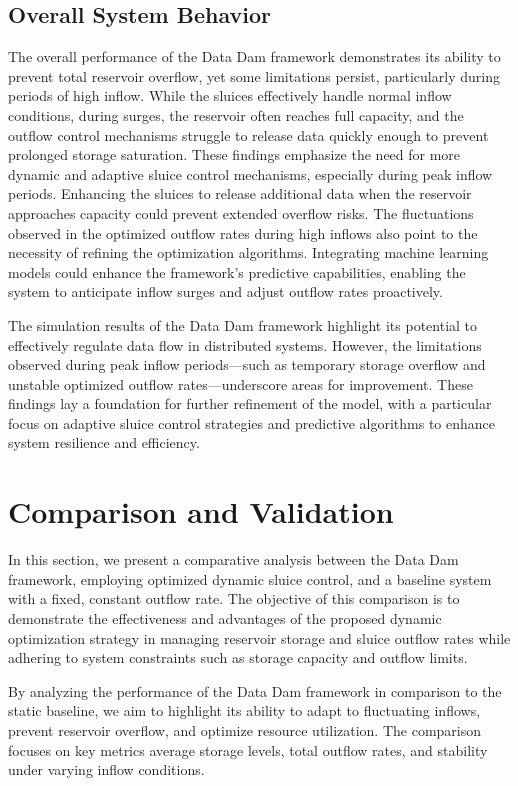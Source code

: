 \subsection{Overall System Behavior}
The overall performance of the Data Dam framework demonstrates its ability to prevent total reservoir overflow, yet some limitations persist, particularly during periods of high inflow. While the sluices effectively handle normal inflow conditions, during surges, the reservoir often reaches full capacity, and the outflow control mechanisms struggle to release data quickly enough to prevent prolonged storage saturation.
\vspace{10pt}
These findings emphasize the need for more dynamic and adaptive sluice control mechanisms, especially during peak inflow periods. Enhancing the sluices to release additional data when the reservoir approaches capacity could prevent extended overflow risks. The fluctuations observed in the optimized outflow rates during high inflows also point to the necessity of refining the optimization algorithms. Integrating machine learning models could enhance the framework's predictive capabilities, enabling the system to anticipate inflow surges and adjust outflow rates proactively.

The simulation results of the Data Dam framework highlight its potential to effectively regulate data flow in distributed systems. However, the limitations observed during peak inflow periods—such as temporary storage overflow and unstable optimized outflow rates—underscore areas for improvement. These findings lay a foundation for further refinement of the model, with a particular focus on adaptive sluice control strategies and predictive algorithms to enhance system resilience and efficiency.


\section{Comparison and Validation}

In this section, we present a comparative analysis between the Data Dam framework, employing optimized dynamic sluice control, and a baseline system with a fixed, constant outflow rate. The objective of this comparison is to demonstrate the effectiveness and advantages of the proposed dynamic optimization strategy in managing reservoir storage and sluice outflow rates while adhering to system constraints such as storage capacity and outflow limits.

By analyzing the performance of the Data Dam framework in comparison to the static baseline, we aim to highlight its ability to adapt to fluctuating inflows, prevent reservoir overflow, and optimize resource utilization. The comparison focuses on key metrics average storage levels, total outflow rates, and stability under varying inflow conditions.

